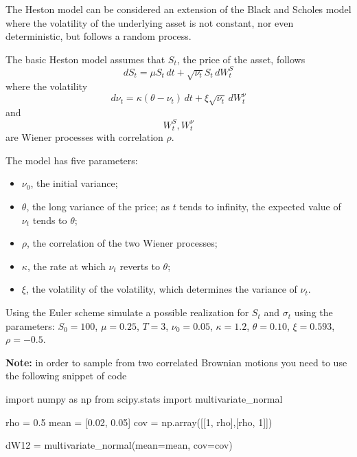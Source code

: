 \documentclass[12pt,a4paper]{book}
\begin{document}
\begin{exercise}[subtitle=Heston Model (\texttt{python})]
The Heston model can be considered an extension of the Black and Scholes model where the volatility of the underlying asset is not constant, nor even deterministic, but follows a random process.

The basic Heston model assumes that $S_t$, the price of the asset, follows
\begin{equation}
dS_{t}=\mu S_{t}\,dt+{\sqrt {\nu _{t}}}S_{t}\,dW_{t}^{S}
\end{equation}
where the volatility 
\begin{equation}
d\nu _{t}=\kappa (\theta -\nu _{t})\,dt+\xi {\sqrt {\nu_{t}}}\,dW_{t}^{\nu }
\end{equation}
and 
\begin{equation}
W_{t}^{S},W_{t}^{\nu }
\end{equation} 
are Wiener processes with correlation $\rho$.

The model has five parameters:
\begin{itemize}
\item $\nu _0$, the initial variance;
\item $\theta$, the long variance of the price; as $t$ tends to infinity, the expected value of $\nu_t$ tends to $\theta$;
\item $\rho$, the correlation of the two Wiener processes;
\item $\kappa$, the rate at which $\nu_t$ reverts to $\theta$;
\item $\xi$, the volatility of the volatility, which determines the variance of $\nu_t$.
\end{itemize}

Using the Euler scheme simulate a possible realization for $S_t$ and $\sigma_t$ using the parameters: $S_0=100$, $\mu=0.25$, $T=3$, $\nu_0=0.05$, $\kappa=1.2$, $\theta=0.10$, $\xi=0.593$, $\rho=-0.5$.

\textbf{Note: } in order to sample from two correlated Brownian motions you need to use the following snippet of code
\begin{ipython}
import numpy as np
from scipy.stats import multivariate_normal

rho = 0.5
mean = [0.02, 0.05]
cov = np.array([[1, rho],[rho, 1]])

dW12 = multivariate_normal(mean=mean, cov=cov)
\end{ipython}
\end{exercise}
\end{document}
